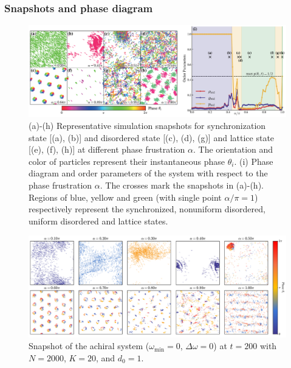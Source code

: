 \documentclass{article}
\begin{document}
\newpage
\subsubsection{Snapshots and phase diagram}

\begin{figure}[H]
    \centering
    \includegraphics[width=\textwidth]{./figs/snapshotsAndPhaseDiagram.pdf}
    \caption{
        (a)-(h) Representative simulation snapshots for synchronization state [(a), (b)] and disordered state [(c), (d), (g)] and lattice state [(e), (f), (h)] at different phase frustration $\alpha$. The orientation and color of particles represent their instantaneous phase $\theta_i$.
        (i) Phase diagram and order parameters of the system with respect to the phase frustration $\alpha$. The crosses mark the snapshots in (a)-(h). Regions of blue, yellow and green (with single point $\alpha/\pi=1$) respectively represent the synchronized, nonuniform disordered, uniform disordered and lattice states.  
    }
\end{figure}



\begin{figure}[H]
    \centering
    \includegraphics[width=\textwidth]{./figs/snapshot_v_alpha_K20.00_d01.00.pdf}
    \caption{
        Snapshot of the achiral system ($\omega _{\min}=0$, $\Delta \omega=0$) at $t=200$ with $N=2000$, $K=20$, and $d_0=1$.
    }
\end{figure}
\end{document}
